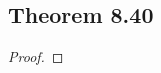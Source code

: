 \documentclass[../../main.tex]{subfiles}
\begin{document}
\subsection{Theorem 8.40}
\begin{wts}

\end{wts}
\begin{proof}

\end{proof}
\end{document}
